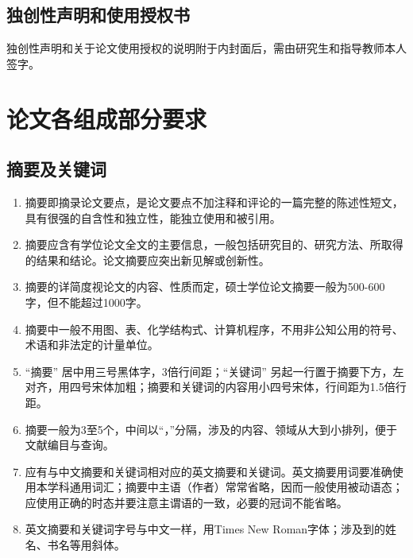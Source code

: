 
\subsection{独创性声明和使用授权书}

独创性声明和关于论文使用授权的说明附于内封面后，需由研究生和指导教师本人签字。


\section{论文各组成部分要求}

\subsection{摘要及关键词}

\begin{enumerate}[label=\arabic*)]
	\item 摘要即摘录论文要点，是论文要点不加注释和评论的一篇完整的陈述性短文，具有很强的自含性和独立性，能独立使用和被引用。
	
	\item 摘要应含有学位论文全文的主要信息，一般包括研究目的、研究方法、所取得的结果和结论。论文摘要应突出新见解或创新性。
	
	\item 摘要的详简度视论文的内容、性质而定，硕士学位论文摘要一般为500-600字，但不能超过1000字。
	
	\item 摘要中一般不用图、表、化学结构式、计算机程序，不用非公知公用的符号、术语和非法定的计量单位。
	
	\item “摘要” 居中用三号黑体字，3倍行间距；“关键词” 另起一行置于摘要下方，左对齐，用四号宋体加粗；摘要和关键词的内容用小四号宋体，行间距为1.5倍行距。
	
	\item 摘要一般为3至5个，中间以“，”分隔，涉及的内容、领域从大到小排列，便于文献编目与查询。
	
	\item 应有与中文摘要和关键词相对应的英文摘要和关键词。英文摘要用词要准确使用本学科通用词汇；摘要中主语（作者）常常省略，因而一般使用被动语态；应使用正确的时态并要注意主谓语的一致，必要的冠词不能省略。
	
	\item 英文摘要和关键词字号与中文一样，用Times New Roman字体；涉及到的姓名、书名等用斜体。
\end{enumerate}

